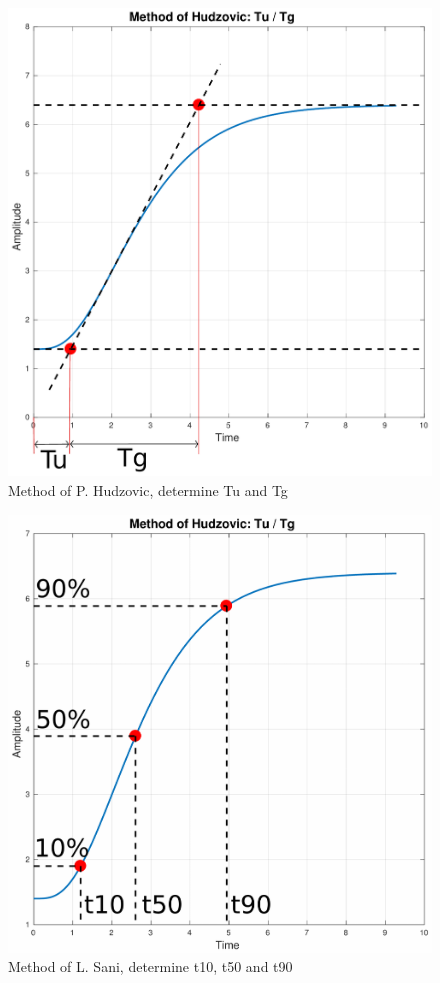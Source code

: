 \begin{figure}[t]
    \includegraphics[width=\linewidth]{images/step_response_tu_tg}
    \caption{Method of P. Hudzovic, determine Tu and Tg}
    \label{fig:tu_tg}
\end{figure}
\begin{figure}[t]
    \includegraphics[width=\linewidth]{images/step_response_t10_t50_t90}
    \caption{Method of L. Sani, determine t10, t50 and t90}
    \label{fig:t10_t50_t90}
\end{figure}

